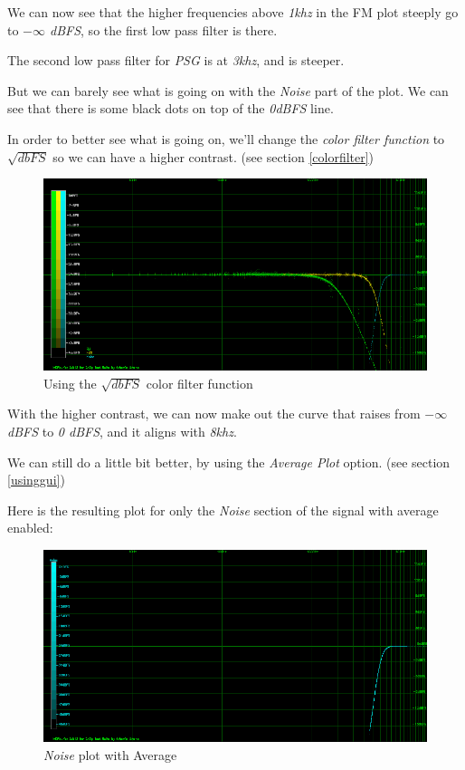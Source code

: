 \documentclass[10pt,a4paper]{report}
\begin{document}
We can now see that the higher frequencies above \textit{1khz} in the FM plot steeply go to \textit{$-\infty$ dBFS}, so the first low pass filter is there.

The second low pass filter for \textit{PSG} is at \textit{3khz}, and is steeper.

But we can barely see what is going on with the \textit{Noise} part of the plot. We can see that there is some black dots on top of the \textit{0dBFS} line.

In order to better see what is going on, we'll change the \textit{color filter function} to $\sqrt{dbFS}$ so we can have a higher contrast. (see section \ref{colorfilter})

\begin{figure}[H]
	\centering
	\includegraphics[width=1.0\linewidth]{plots/Plot4-2-All-sqrt}
	\caption[Using SQRT]{Using the $\sqrt{dbFS}$ color filter function}
	\label{fig:plot4-2-all-sqrt}
\end{figure}

With the higher contrast, we can now make out the curve that raises from \textit{$-\infty$ dBFS} to \textit{0 dBFS}, and it aligns with \textit{8khz}.

We can still do a little bit better, by using the \textit{Average Plot} option. (see section \ref{usinggui})

Here is the resulting plot for only the \textit{Noise} section of the signal with average enabled:

\begin{figure}[H]
	\centering
	\includegraphics[width=1.0\linewidth]{plots/Plot4-3-AVG-Noise}
	\caption[Noise Average]{\textit{Noise} plot with Average}
	\label{fig:plot4-3-avg-noise}
\end{figure}
\end{document}
